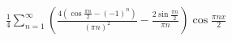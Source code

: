 \documentclass[preview]{standalone}
\begin{document}
\begin{align*}
\frac{1}{4} \sum_{n=1}^{\infty}
    \left( \frac{4 (\cos \frac{\pi n}{2} - (-1)^n)}{(\pi n)^2} - \frac{2 \sin \frac{\pi n}{2}}{\pi n} \right) \cos \frac{\pi n x}{2}
\end{align*}
\end{document}
